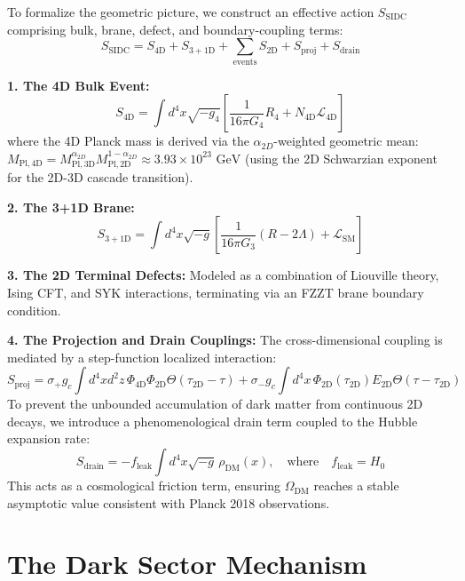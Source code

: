 \documentclass[12pt, a4paper]{article}
\newcommand{\mpld}[1]{M_{\text{Pl},#1\text{D}}}
\begin{document}
To formalize the geometric picture, we construct an effective action $S_{\text{SIDC}}$ comprising bulk, brane, defect, and boundary-coupling terms:
\begin{equation}
    S_{\text{SIDC}} = S_{4\text{D}} + S_{3+1\text{D}} + \sum_{\text{events}} S_{2\text{D}} + S_{\text{proj}} + S_{\text{drain}}
\end{equation}

\textbf{1. The 4D Bulk Event:}
\begin{equation}
    S_{4\text{D}} = \int d^4x \sqrt{-g_4} \left[ \frac{1}{16\pi G_4} R_4 + N_{4\text{D}} \mathcal{L}_{4\text{D}} \right]
\end{equation}
where the 4D Planck mass is derived via the $\alpha_{2D}$-weighted geometric mean: $\mpld{4} = \mpld{3}^{\alpha_{2D}} \mpld{2}^{1-\alpha_{2D}} \approx 3.93 \times 10^{23} \text{ GeV}$ (using the 2D Schwarzian exponent for the 2D-3D cascade transition).

\textbf{2. The 3+1D Brane:}
\begin{equation}
    S_{3+1\text{D}} = \int d^4x \sqrt{-g} \left[ \frac{1}{16\pi G_3}(R - 2\Lambda) + \mathcal{L}_{\text{SM}} \right]
\end{equation}

\textbf{3. The 2D Terminal Defects:}
Modeled as a combination of Liouville theory, Ising CFT, and SYK interactions, terminating via an FZZT brane boundary condition. 

\textbf{4. The Projection and Drain Couplings:}
The cross-dimensional coupling is mediated by a step-function localized interaction:
\begin{equation}
    S_{\text{proj}} = \sigma_+ g_c \int d^4x d^2z \, \Phi_{4\text{D}} \Phi_{2\text{D}} \Theta(\tau_{2\text{D}} - \tau) + \sigma_- g_c \int d^4x \, \Phi_{2\text{D}}(\tau_{2\text{D}}) E_{2\text{D}} \Theta(\tau - \tau_{2\text{D}})
\end{equation}
To prevent the unbounded accumulation of dark matter from continuous 2D decays, we introduce a phenomenological drain term coupled to the Hubble expansion rate:
\begin{equation}
    S_{\text{drain}} = -f_{\text{leak}} \int d^4x \sqrt{-g} \, \rho_{\text{DM}}(x), \quad \text{where} \quad f_{\text{leak}} = H_0
\end{equation}
This acts as a cosmological friction term, ensuring $\Omega_{\text{DM}}$ reaches a stable asymptotic value consistent with Planck 2018 observations.

\section{The Dark Sector Mechanism}
\label{sec:darksector}
\end{document}

